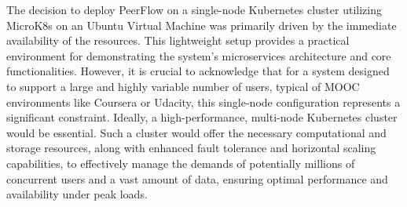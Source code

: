 \begin{justify}
    The decision to deploy PeerFlow on a single-node Kubernetes cluster utilizing MicroK8s on an Ubuntu Virtual Machine was primarily driven by the immediate availability of the resources. This lightweight setup provides a practical environment for demonstrating the system's microservices architecture and core functionalities. However, it is crucial to acknowledge that for a system designed to support a large and highly variable number of users, typical of MOOC environments like Coursera or Udacity, this single-node configuration represents a significant constraint. Ideally, a high-performance, multi-node Kubernetes cluster would be essential. Such a cluster would offer the necessary computational and storage resources, along with enhanced fault tolerance and horizontal scaling capabilities, to effectively manage the demands of potentially millions of concurrent users and a vast amount of data, ensuring optimal performance and availability under peak loads.
\end{justify}
